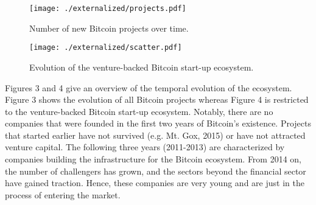 \begin{figure}
\centering
\texttt{[image: ./externalized/projects.pdf]}
\caption{Number of new Bitcoin projects over time.}
\end{figure}

\begin{figure}
\centering
\texttt{[image: ./externalized/scatter.pdf]}
\caption{Evolution of the venture-backed Bitcoin start-up ecosystem.}
\end{figure}

Figures 3 and 4 give an overview of the temporal evolution of the ecosystem. Figure 
3 shows the evolution of all Bitcoin projects whereas Figure 4 is restricted to 
the venture-backed Bitcoin start-up ecosystem. Notably, there are no companies 
that were founded in the first two years of Bitcoin's existence. Projects that 
started earlier have not survived (e.g. Mt. Gox, 2015) or have not attracted venture 
capital. The following three years (2011-2013) are characterized by companies building 
the infrastructure for the Bitcoin ecosystem. From 2014 on, the number of challengers 
has grown, and the sectors beyond the financial sector have gained traction. Hence, 
these companies are very young and are just in the process of entering the market.

